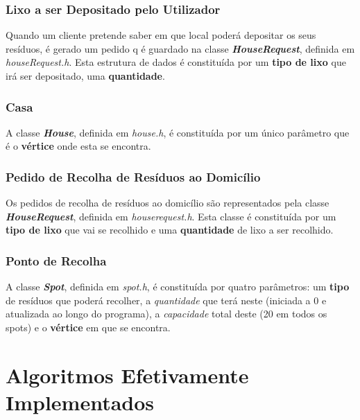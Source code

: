 \documentclass[article, a4paper, 12pt, oneside]{memoir}
\begin{document}
\subsection{Lixo a ser Depositado pelo Utilizador}

Quando um cliente pretende saber em que local poderá depositar os seus resíduos, é gerado um pedido q é guardado na classe \textbf{\textit{HouseRequest}}, definida em \textit{houseRequest.h}. Esta estrutura de dados é constituída por um \textbf{tipo de lixo} que irá ser depositado, uma \textbf{quantidade}.

\subsection{Casa}

A classe \textbf{\textit{House}}, definida em \textit{house.h}, é constituída por um único parâmetro que é o \textbf{vértice} onde esta se encontra.

\subsection{Pedido de Recolha de Resíduos ao Domicílio}

Os pedidos de recolha de resíduos ao domicílio são representados pela classe \textbf{\textit{HouseRequest}}, definida em \textit{houserequest.h}. Esta classe é constituída por um \textbf{tipo de lixo} que vai se recolhido e uma \textbf{quantidade} de lixo a ser recolhido.

\subsection{Ponto de Recolha}

A classe \textbf{\textit{Spot}}, definida em \textit{spot.h}, é constituída por quatro parâmetros: um \textbf{tipo} de resíduos que poderá recolher, a \textit{quantidade} que terá neste (iniciada a 0 e atualizada ao longo do programa), a \textit{capacidade} total deste (20 em todos os spots) e o \textbf{vértice} em que se encontra.

\newpage
\chapter[Algoritmos Efetivamente Implementados][Algoritmos Efetivamente Implementados]{Algoritmos Efetivamente Implementados} \label{\thechapter}
\end{document}
